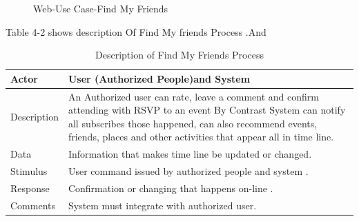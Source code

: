 \documentclass[12pt,a4paper,class,twoside,openany]{report}
\begin{document}
{\begin{figure}
\begin{center}
{}
\caption{Web-Use Case-Find My Friends}
\label{fg:4-5}
\end{center}
\end{figure}
Table 4-2 shows description Of Find My friends Process .And
\begin{table}
\centering
\begin{tabular}{|l| p{10 cm} |}
\hline
Actor & User (Authorized People)and System \\ \hline
Description & An Authorized user can rate, leave a comment and confirm attending with RSVP to  an event 
By Contrast System can notify all subscribes those happened, can also recommend events, friends, places and other activities that appear all in time line.\\ \hline
Data & Information that makes time line be updated or changed. \\ \hline
Stimulus & User command issued by authorized people and system . \\ \hline
Response & Confirmation or changing that happens on-line .\\ \hline
Comments & System must integrate with authorized user.\\ \hline
\end{tabular}
\caption{ Description of Find My Friends Process}
\label{tab:table 4-2}
\end{table}

}
\end{document}
